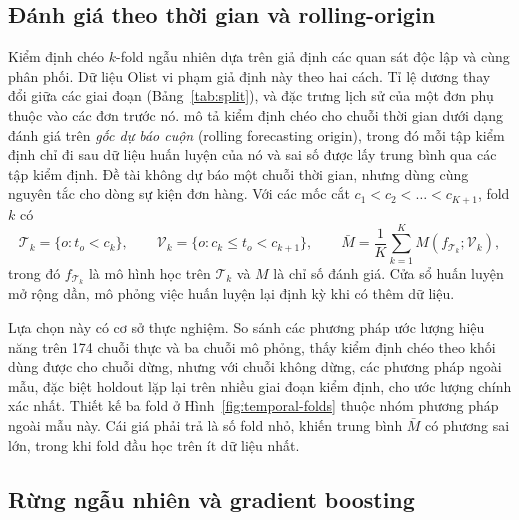 \subsection{Đánh giá theo thời gian và rolling-origin}\label{sec:th-temporal}

Kiểm định chéo $k$-fold ngẫu nhiên dựa trên giả định các quan sát độc lập và cùng phân phối. Dữ liệu Olist vi phạm giả định này theo hai cách. Tỉ lệ dương thay đổi giữa các giai đoạn (Bảng~\ref{tab:split}), và đặc trưng lịch sử của một đơn phụ thuộc vào các đơn trước nó. \textcite{hyndman2021} mô tả kiểm định chéo cho chuỗi thời gian dưới dạng đánh giá trên \emph{gốc dự báo cuộn} (rolling forecasting origin), trong đó mỗi tập kiểm định chỉ đi sau dữ liệu huấn luyện của nó và sai số được lấy trung bình qua các tập kiểm định. Đề tài không dự báo một chuỗi thời gian, nhưng dùng cùng nguyên tắc cho dòng sự kiện đơn hàng. Với các mốc cắt $c_1 < c_2 < \dots < c_{K+1}$, fold $k$ có
\begin{equation}\label{eq:th-rolling}
  \mathcal{T}_k = \{ o : t_o < c_k \}, \qquad
  \mathcal{V}_k = \{ o : c_k \le t_o < c_{k+1} \}, \qquad
  \bar{M} = \frac{1}{K} \sum_{k=1}^{K} M\!\left(f_{\mathcal{T}_k}; \mathcal{V}_k\right),
\end{equation}
trong đó $f_{\mathcal{T}_k}$ là mô hình học trên $\mathcal{T}_k$ và $M$ là chỉ số đánh giá. Cửa sổ huấn luyện mở rộng dần, mô phỏng việc huấn luyện lại định kỳ khi có thêm dữ liệu.

Lựa chọn này có cơ sở thực nghiệm. So sánh các phương pháp ước lượng hiệu năng trên 174 chuỗi thực và ba chuỗi mô phỏng, \textcite{cerqueira2020} thấy kiểm định chéo theo khối dùng được cho chuỗi dừng, nhưng với chuỗi không dừng, các phương pháp ngoài mẫu, đặc biệt holdout lặp lại trên nhiều giai đoạn kiểm định, cho ước lượng chính xác nhất. Thiết kế ba fold ở Hình~\ref{fig:temporal-folds} thuộc nhóm phương pháp ngoài mẫu này. Cái giá phải trả là số fold nhỏ, khiến trung bình $\bar M$ có phương sai lớn, trong khi fold đầu học trên ít dữ liệu nhất.

\subsection{Rừng ngẫu nhiên và gradient boosting}\label{sec:th-trees}

